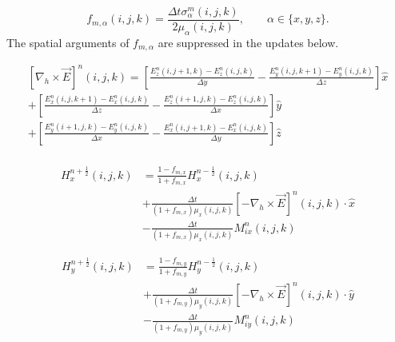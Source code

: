 \documentclass[10pt]{article}
\begin{document}
\begin{equation}
	\boxed{
		f_{m,\alpha}(i,j,k) = \frac{\Delta t \sigma^{m}_{\alpha}(i,j,k)}{2\mu_{\alpha}(i,j,k)},
        \qquad \alpha\in\{x,y,z\}.
	}
\end{equation}
The spatial arguments of $f_{m,\alpha}$ are suppressed in the updates below.


\begin{equation}
	\boxed{
		\begin{aligned}
			\left[\nabla_h \times \vec{E} \right]^{n}(i,j,k) =
			\left[\frac{E^{n}_{z}(i,j+1,k)-E^{n}_{z}(i,j,k)}{\Delta y}
			-\frac{E^{n}_{y}(i,j,k+1)-E^{n}_{y}(i,j,k)}{\Delta z} \right] \hat{x} \\
			+\left[\frac{E^{n}_{x}(i,j,k+1)-E^{n}_{x}(i,j,k)}{\Delta z}
			-\frac{E^{n}_{z}(i+1,j,k)-E^{n}_{z}(i,j,k)}{\Delta x} \right] \hat{y} \\
			+\left[\frac{E^{n}_{y}(i+1,j,k)-E^{n}_{y}(i,j,k)}{\Delta x}
			-\frac{E^{n}_{x}(i,j+1,k)-E^{n}_{x}(i,j,k)}{\Delta y} \right] \hat{z} \\
		\end{aligned}
	}
\end{equation}


\begin{equation}
	\boxed{
		\begin{aligned}
			H^{n+\frac{1}{2}}_{x}(i,j,k) & = \frac{1-f_{m,x}}{1+f_{m,x}}  H^{n-\frac{1}{2}}_{x}(i,j,k)                                                    \\
			                             & + \frac{\Delta t}{(1+f_{m,x})\mu_{x}(i,j,k)} \left[ -\nabla_h\times \vec{E} \right]^{n}(i,j,k) \cdot \hat{x} \\
			                             & - \frac{\Delta t}{(1+f_{m,x})\mu_{x}(i,j,k)} M^{n}_{ix}(i,j,k)
		\end{aligned}
	}
\end{equation}

\begin{equation}
	\boxed{
		\begin{aligned}
			H^{n+\frac{1}{2}}_{y}(i,j,k) & = \frac{1-f_{m,y}}{1+f_{m,y}}  H^{n-\frac{1}{2}}_{y}(i,j,k)                                                    \\
			                             & + \frac{\Delta t}{(1+f_{m,y})\mu_{y}(i,j,k)} \left[ -\nabla_h\times \vec{E} \right]^{n}(i,j,k) \cdot \hat{y} \\
			                             & - \frac{\Delta t}{(1+f_{m,y})\mu_{y}(i,j,k)} M^{n}_{iy}(i,j,k)
		\end{aligned}
	}
\end{equation}
\end{document}
